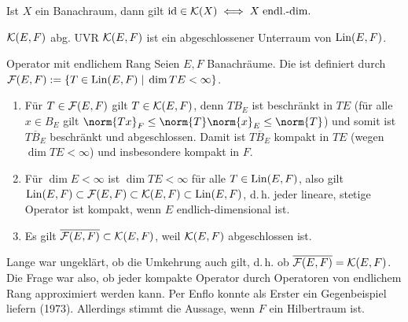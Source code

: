 \begin{Bem}
    Ist $X$ ein Banachraum, dann gilt $\text{id} \in \mathcal{K}(X) \iff X \;\text{endl.-dim.}$
\end{Bem}

\begin{Lemma}{$\mathcal{K}(E, F)$ abg. UVR}
    $\mathcal{K}(E, F)$ ist ein abgeschlossener Unterraum von $\operatorname{Lin}(E, F)$.
\end{Lemma}

\linie

\begin{Def}{Operator mit endlichem Rang}
    Seien $E, F$ Banachräume.
    Die  ist definiert durch
    $\mathcal{F}(E, F) := \{T \in \operatorname{Lin}(E, F) \;|\; \dim TE < \infty\}$.
\end{Def}

\begin{Bsp}
    \begin{enumerate}[label=\emph{(\alph*)}]
        \item
        Für $T \in \mathcal{F}(E, F)$ gilt $T \in \mathcal{K}(E, F)$, denn
        $TB_E$ ist beschränkt in $TE$ (für alle $x \in B_E$ gilt
        $\norm{Tx}_F \le \norm{T} \norm{x}_E \le \norm{T}$) und
        somit ist $\overline{TB_E}$ beschränkt und abgeschlossen.
        Damit ist $\overline{TB_E}$ kompakt in $TE$ (wegen $\dim TE < \infty$)
        und insbesondere kompakt in $F$.

        \item
        Für $\dim E < \infty$ ist $\dim TE < \infty$ für alle $T \in \operatorname{Lin}(E, F)$,
        also gilt\\
        $\operatorname{Lin}(E, F) \subset \mathcal{F}(E, F) \subset \mathcal{K}(E, F) \subset \operatorname{Lin}(E, F)$,
        d.\,h. jeder lineare, stetige Operator ist kompakt, wenn $E$ endlich-dimensional ist.

        \item
        Es gilt $\overline{\mathcal{F}(E, F)} \subset \mathcal{K}(E, F)$, weil $\mathcal{K}(E, F)$ abgeschlossen ist.
    \end{enumerate}
\end{Bsp}

\begin{Bem}
    Lange war ungeklärt, ob die Umkehrung auch gilt,
    d.\,h. ob $\overline{\mathcal{F}(E, F)} = \mathcal{K}(E, F)$.
    Die Frage war also, ob jeder kompakte Operator durch Operatoren von endlichem Rang
    approximiert werden kann.
    Per Enflo konnte als Erster ein Gegenbeispiel liefern (1973).
    Allerdings stimmt die Aussage, wenn $F$ ein Hilbertraum ist.
\end{Bem}

